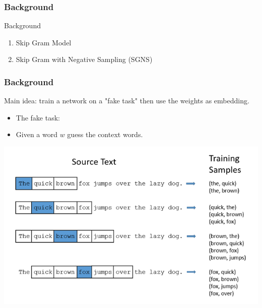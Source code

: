 \begin{frame}\frametitle{Background}
\begin{Large}
Background
\end{Large}
\begin{enumerate}
\item Skip Gram Model 
\item Skip Gram with Negative Sampling (SGNS)
\end{enumerate}
\end{frame}
\begin{frame}\frametitle{Background}
Main idea: train a network on a "fake task" then use the weights as embedding. \bigskip
\begin{itemize}
\item The fake task:
\item Given a word $w$ guess the context words. 
\end{itemize}
\includegraphics[scale=0.37]{images/context_pairs.png}
\end{frame}

